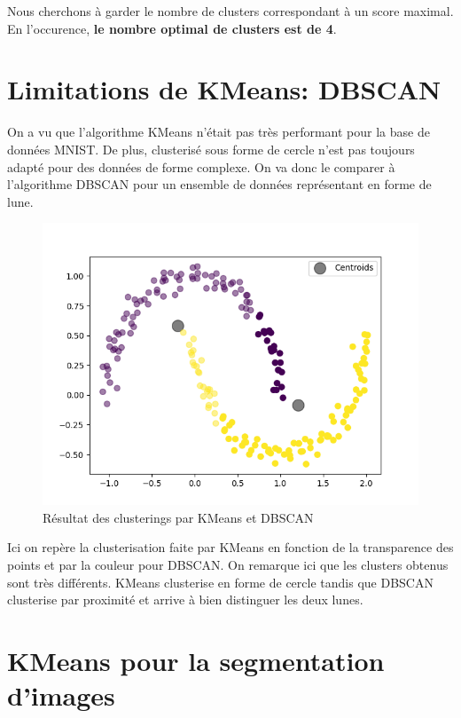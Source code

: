 \documentclass[french,a4paper,18pt]{article}
\begin{document}
Nous cherchons à garder le nombre de clusters correspondant à un score maximal. En l'occurence, \textbf{le nombre optimal de clusters est de 4}.

\section{Limitations de KMeans: DBSCAN}

On a vu que l'algorithme KMeans n'était pas très performant pour la base de données MNIST.
De plus, clusterisé sous forme de cercle n'est pas toujours adapté pour des données de forme complexe.
On va donc le comparer à l'algorithme DBSCAN pour un ensemble de données représentant en forme de lune.

\begin{figure}[h!]
    \centering
    \includegraphics[scale=0.5]{images/moon_dbscan.png}
    \caption{Résultat des clusterings par KMeans et DBSCAN}\label{fig:dbscan_moon}
\end{figure}

Ici on repère la clusterisation faite par KMeans en fonction de la transparence des points et par la couleur pour DBSCAN. 
On remarque ici que les clusters obtenus sont très différents. 
KMeans clusterise en forme de cercle tandis que DBSCAN clusterise par proximité et arrive à bien distinguer les deux lunes.

\section{KMeans pour la segmentation d'images}
\end{document}

